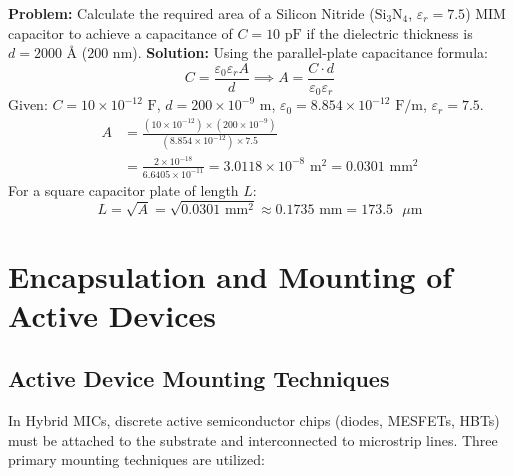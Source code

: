 \documentclass[12pt,a4paper]{article}
\begin{document}
\begin{tcolorbox}[examplebox, title={MIM Capacitor Calculation}]
  \textbf{Problem:} Calculate the required area of a Silicon Nitride ($\text{Si}_3\text{N}_4$, $\varepsilon_r = 7.5$) MIM capacitor to achieve a capacitance of $C = 10\text{ pF}$ if the dielectric thickness is $d = 2000\text{ \AA}$ ($200\text{ nm}$).
  \tcblower
  \textbf{Solution:}
  Using the parallel-plate capacitance formula:
  \begin{equation}
    C = \frac{\varepsilon_0 \varepsilon_r A}{d} \implies A = \frac{C \cdot d}{\varepsilon_0 \varepsilon_r}
  \end{equation}
  Given: $C = 10 \times 10^{-12}\text{ F}$, $d = 200 \times 10^{-9}\text{ m}$, $\varepsilon_0 = 8.854 \times 10^{-12}\text{ F/m}$, $\varepsilon_r = 7.5$.
  \begin{equation}
    \begin{aligned}
      A &= \frac{(10 \times 10^{-12}) \times (200 \times 10^{-9})}{(8.854 \times 10^{-12}) \times 7.5} \\
      &= \frac{2 \times 10^{-18}}{6.6405 \times 10^{-11}} = 3.0118 \times 10^{-8}\text{ m}^2 = 0.0301\text{ mm}^2
    \end{aligned}
  \end{equation}
  For a square capacitor plate of length $L$:
  \begin{equation}
    L = \sqrt{A} = \sqrt{0.0301\text{ mm}^2} \approx 0.1735\text{ mm} = 173.5\text{ }\mu\text{m}
  \end{equation}
\end{tcolorbox}

\section{Encapsulation and Mounting of Active Devices}

\subsection{Active Device Mounting Techniques}
In Hybrid MICs, discrete active semiconductor chips (diodes, MESFETs, HBTs) must be attached to the substrate and interconnected to microstrip lines. Three primary mounting techniques are utilized:
\end{document}

